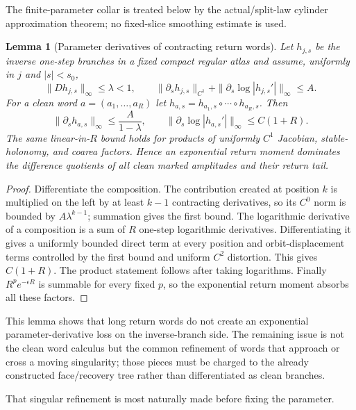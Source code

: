 \documentclass[11pt]{article}
\newtheorem{lemma}[theorem]{Lemma}
\begin{document}
The finite-parameter collar is treated below by the actual/split-law cylinder
approximation theorem; no fixed-slice smoothing estimate is used.

\begin{lemma}[Parameter derivatives of contracting return words]
\label{lem:parametric-inverse-word}
Let $h_{j,s}$ be the inverse one-step branches in a fixed compact regular
atlas and assume, uniformly in $j$ and $|s|<s_0$,
\[
 \|Dh_{j,s}\|_\infty\le\lambda<1,
 \qquad
 \|\partial_sh_{j,s}\|_{C^1}
 +\|\partial_s\log|h_{j,s}'|\|_\infty\le A.
\]
For a clean word $a=(a_1,\ldots,a_R)$ let
$h_{a,s}=h_{a_1,s}\circ\cdots\circ h_{a_R,s}$.  Then
\begin{equation}
\label{eq:parametric-word-bounds}
 \|\partial_s h_{a,s}\|_\infty\le \frac{A}{1-\lambda},
 \qquad
 \|\partial_s\log|h_{a,s}'|\|_\infty\le C(1+R).
\end{equation}
The same linear-in-$R$ bound holds for products of uniformly $C^1$
Jacobian, stable-holonomy, and coarea factors.  Hence an exponential return
moment dominates the difference quotients of all clean marked amplitudes and
their return tail.
\end{lemma}

\begin{proof}
Differentiate the composition.  The contribution created at position $k$ is
multiplied on the left by at least $k-1$ contracting derivatives, so its
$C^0$ norm is bounded by $A\lambda^{k-1}$; summation gives the first bound.
The logarithmic derivative of a composition is a sum of $R$ one-step
logarithmic derivatives.  Differentiating it gives a uniformly bounded direct
term at every position and orbit-displacement terms controlled by the first
bound and uniform $C^2$ distortion.  This gives $C(1+R)$.  The product
statement follows after taking logarithms.  Finally
$R^p e^{-\epsilon R}$ is summable for every fixed $p$, so the exponential
return moment absorbs all these factors.
\end{proof}

This lemma shows that long return words do not create an exponential
parameter-derivative loss on the inverse-branch side.  The remaining issue is
not the clean word calculus but the common refinement of words that approach
or cross a moving singularity; those pieces must be charged to the already
constructed face/recovery tree rather than differentiated as clean branches.

That singular refinement is most naturally made before fixing the parameter.
\end{document}
